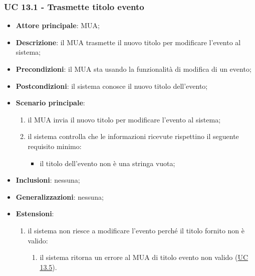 \subsubsection{UC 13.1 - Trasmette titolo evento} \label{sec:UC13.1}
    \begin{itemize}
        \item \textbf{Attore principale}: MUA;
        \item \textbf{Descrizione}: il MUA trasmette il nuovo titolo per modificare l'evento al sistema;
        \item \textbf{Precondizioni}: il MUA sta usando la funzionalità di modifica di un evento;
        \item \textbf{Postcondizioni}: il sistema conosce il nuovo titolo dell'evento;
        \item \textbf{Scenario principale}:
            \begin{enumerate}
                \item il MUA invia il nuovo titolo per modificare l'evento al sistema;
                \item il sistema controlla che le informazioni ricevute rispettino il seguente requisito minimo:
                    \begin{itemize}
                        \item il titolo dell'evento non è una stringa vuota;
                    \end{itemize}
            \end{enumerate}
        \item \textbf{Inclusioni}: nessuna;
        \item \textbf{Generalizzazioni}: nessuna;
        \item \textbf{Estensioni}:
            \begin{enumerate}[label=\alph*.]
                \item il sistema non riesce a modificare l'evento perché il titolo fornito non è valido:
                \begin{enumerate}[label=\arabic*.]
                    \item il sistema ritorna un errore al MUA di titolo evento non valido (\hyperref[sec:UC13.5]{UC 13.5}).
                \end{enumerate}
            \end{enumerate}
    \end{itemize}



